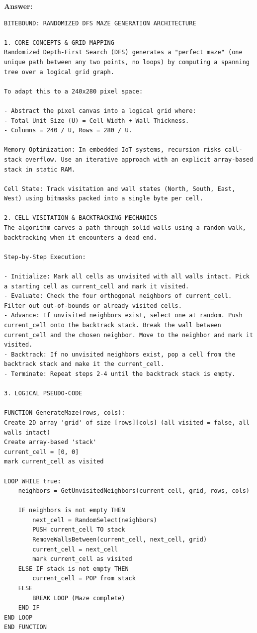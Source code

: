 \textbf{Answer:}
\begin{lstlisting}[language={}, breaklines=true]
BITEBOUND: RANDOMIZED DFS MAZE GENERATION ARCHITECTURE

1. CORE CONCEPTS & GRID MAPPING
Randomized Depth-First Search (DFS) generates a "perfect maze" (one unique path between any two points, no loops) by computing a spanning tree over a logical grid graph.

To adapt this to a 240x280 pixel space:

- Abstract the pixel canvas into a logical grid where:
- Total Unit Size (U) = Cell Width + Wall Thickness.
- Columns = 240 / U, Rows = 280 / U.

Memory Optimization: In embedded IoT systems, recursion risks call-stack overflow. Use an iterative approach with an explicit array-based stack in static RAM.

Cell State: Track visitation and wall states (North, South, East, West) using bitmasks packed into a single byte per cell.

2. CELL VISITATION & BACKTRACKING MECHANICS
The algorithm carves a path through solid walls using a random walk, backtracking when it encounters a dead end.

Step-by-Step Execution:

- Initialize: Mark all cells as unvisited with all walls intact. Pick a starting cell as current_cell and mark it visited.
- Evaluate: Check the four orthogonal neighbors of current_cell. Filter out out-of-bounds or already visited cells.
- Advance: If unvisited neighbors exist, select one at random. Push current_cell onto the backtrack stack. Break the wall between current_cell and the chosen neighbor. Move to the neighbor and mark it visited.
- Backtrack: If no unvisited neighbors exist, pop a cell from the backtrack stack and make it the current_cell.
- Terminate: Repeat steps 2-4 until the backtrack stack is empty.

3. LOGICAL PSEUDO-CODE

FUNCTION GenerateMaze(rows, cols):
Create 2D array 'grid' of size [rows][cols] (all visited = false, all walls intact)
Create array-based 'stack'
current_cell = [0, 0]
mark current_cell as visited

LOOP WHILE true:
    neighbors = GetUnvisitedNeighbors(current_cell, grid, rows, cols)
    
    IF neighbors is not empty THEN
        next_cell = RandomSelect(neighbors)
        PUSH current_cell TO stack
        RemoveWallsBetween(current_cell, next_cell, grid)
        current_cell = next_cell
        mark current_cell as visited
    ELSE IF stack is not empty THEN
        current_cell = POP from stack
    ELSE
        BREAK LOOP (Maze complete)
    END IF
END LOOP
END FUNCTION


\end{lstlisting}
